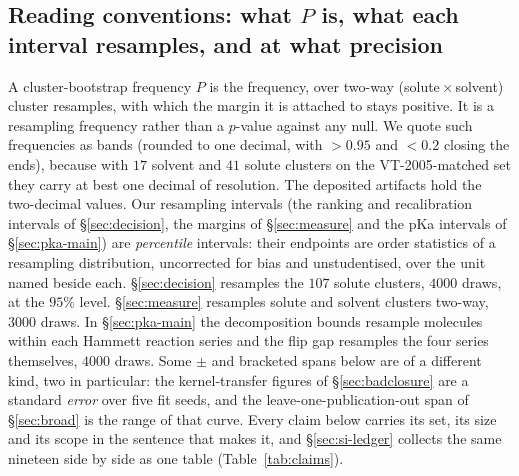 \subsection{Reading conventions: what $P$ is, what each interval resamples, and at what precision}
\label{sec:si-conventions}
A cluster-bootstrap frequency $P$ is the frequency, over two-way (solute\,$\times$\,solvent) cluster
resamples, with which the margin it is attached to stays positive. It is a resampling frequency rather
than a $p$-value against any null. We quote such frequencies as bands (rounded to one decimal, with
$>0.95$ and $<0.2$ closing the ends), because with $17$ solvent and $41$ solute clusters on the
VT-2005-matched set they carry at best one decimal of resolution. The deposited artifacts hold the
two-decimal values.
Our resampling intervals (the ranking and recalibration intervals of
\S\ref{sec:decision}, the margins of \S\ref{sec:measure} and the
pKa intervals of \S\ref{sec:pka-main}) are \emph{percentile} intervals: their endpoints are order
statistics of a resampling distribution, uncorrected for bias and unstudentised, over the unit
named beside each. \S\ref{sec:decision} resamples the $107$ solute clusters, $4000$ draws, at the
$95\%$ level. \S\ref{sec:measure} resamples solute and solvent clusters two-way, $3000$ draws.
In \S\ref{sec:pka-main} the decomposition bounds resample molecules within each Hammett reaction
series and the flip gap resamples the four series themselves, $4000$ draws. Some $\pm$ and
bracketed spans below are of a different kind, two in particular: the kernel-transfer
figures of \S\ref{sec:badclosure} are a standard \emph{error} over five fit seeds, and the
leave-one-publication-out span of \S\ref{sec:broad} is the range of that curve.
Every claim below carries its set, its size and its scope in the sentence that makes it, and
\S\ref{sec:si-ledger} collects the same nineteen side by side as one table
(Table~\ref{tab:claims}).

